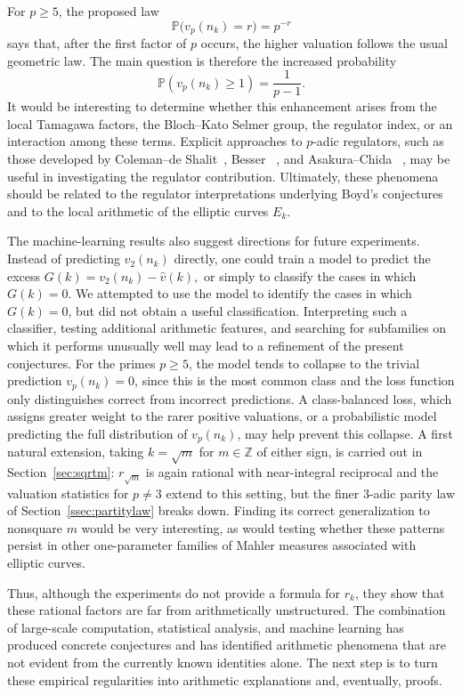 \documentclass[12pt]{amsart}%
\newcommand{\1}{\mathds{1}}
\theoremstyle{definition}
\numberwithin{equation}{section}
\numberwithin{table}{section}
\numberwithin{figure}{section}
\begin{document}
For $p\geq5$, the proposed law
\[
\mathbb P\bigl(v_p(n_k)=r\bigr)=p^{-r}
\]
says that, after the first factor of $p$ occurs, the higher
valuation follows the usual geometric law.  The main question
is therefore the increased probability
\[
\mathbb P(v_p(n_k) \geq 1)=\frac{1}{p-1}.
\]
It would be interesting to determine whether this
enhancement arises from the local Tamagawa factors, the
Bloch--Kato Selmer group, the regulator index, or an interaction
among these terms.  Explicit approaches to $p$-adic regulators,
such as those developed by Coleman--de Shalit~\cite{Coleman-de-Shalit}, Besser ~\cite{Besser}, and
Asakura--Chida ~\cite{AsakuraChida}, may be useful in investigating the regulator
contribution. Ultimately, these phenomena should be related to the regulator
interpretations underlying Boyd's conjectures and to the local arithmetic of
the elliptic curves $E_k$.


The machine-learning results also suggest  directions for future
experiments.
Instead of predicting $v_2(n_k)$ directly, one could train a model
to predict the excess $G(k)=v_2(n_k)-\widehat v(k),$
or simply to classify the cases in which $G(k)=0$. We attempted to use the model to identify the cases in which $G(k)=0$, but did not obtain a useful classification. Interpreting such a
classifier, testing additional arithmetic features, and searching for
subfamilies on which it performs unusually well may lead to a refinement of
the present conjectures. For the primes $p\geq5$, the model tends to collapse to the trivial prediction $v_p(n_k) = 0$, since this is the most common class and the loss function only distinguishes correct from incorrect predictions. A class-balanced loss, which assigns greater weight to the rarer positive valuations, or a probabilistic model predicting the full distribution of $v_p(n_k)$, may help prevent this collapse.%
A first natural extension, taking $k=\sqrt m$ for $m\in\mathbb Z$ of either sign, is
carried out in Section~\ref{sec:sqrtm}: $r_{\sqrt m}$ is again rational with
near-integral reciprocal and the valuation statistics for $p\neq3$ extend to this setting, but the finer $3$-adic parity law of
Section~\ref{ssec:partitylaw} breaks down. Finding its correct generalization to
nonsquare $m$ would be very interesting, as would
testing whether these patterns persist in other one-parameter families of Mahler
measures associated with elliptic curves.

Thus, although the experiments do not provide a formula for $r_k$, they show
that these rational factors are far from arithmetically unstructured. The
combination of large-scale computation, statistical analysis, and machine
learning has produced concrete conjectures and has identified arithmetic phenomena that are not evident
from the currently known identities alone. The next step is
to turn these empirical regularities into arithmetic explanations and,
eventually, proofs.
\end{document}
